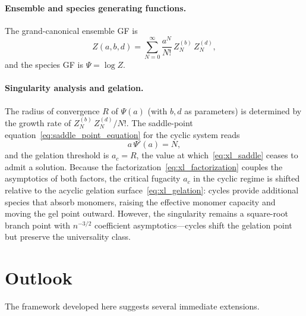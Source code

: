 \documentclass[11pt]{amsart}
\newcommand{\GFensemble}{Z}
\newcommand{\GFcomb}{\Psi}
\theoremstyle{definition}
\theoremstyle{plain}
\theoremstyle{remark}
\begin{document}
\paragraph{Ensemble and species generating functions.}
The grand-canonical ensemble GF is
\begin{equation}\label{eq:xl_ensemble}
\GFensemble(a,b,d)
= \sum_{N=0}^{\infty}\frac{a^N}{N!}\,\GFensemble_N^{(b)}\,\GFensemble_N^{(d)},
\end{equation}
and the species GF is $\GFcomb = \log\GFensemble$.

\paragraph{Singularity analysis and gelation.}
The radius of convergence $R$ of $\GFcomb(a)$ (with $b,d$ as parameters) is determined by the growth rate of $\GFensemble_N^{(b)}\,\GFensemble_N^{(d)}/N!$.
The saddle-point equation~\eqref{eq:saddle_point_equation} for the cyclic system reads
\begin{equation}\label{eq:xl_saddle}
a\,\GFcomb'(a) = N,
\end{equation}
and the gelation threshold is $a_c = R$, the value at which~\eqref{eq:xl_saddle} ceases to admit a solution.
Because the factorization~\eqref{eq:xl_factorization} couples the asymptotics of both factors, the critical fugacity $a_c$ in the cyclic regime is shifted relative to the acyclic gelation surface~\eqref{eq:xl_gelation}: cycles provide additional species that absorb monomers, raising the effective monomer capacity and moving the gel point outward.
However, the singularity remains a square-root branch point with $n^{-3/2}$ coefficient asymptotics---cycles shift the gelation point but preserve the universality class.


\section{Outlook}
\label{sec:outlook}

The framework developed here suggests several immediate extensions.
\end{document}
